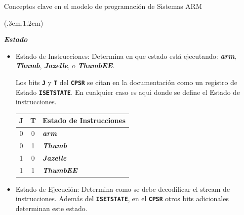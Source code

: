 \documentclass[usenames,table,dvipsnames,aspectratio=169]{beamer}
\newcommand{\arm}{\textbf{\textit{arm}}}
\newcommand{\Thumb}{\textbf{\textit{Thumb}}}
\newcommand{\jazz}{\textbf{\textit{Jazelle}}}
\newcommand{\tbee}{\textbf{\textit{ThumbEE}}}
\begin{document}
\begin{frame}{Conceptos clave en el modelo de programación de Sistemas ARM}
 \begin{textblock*}{\textwidth}(.3cm,1.2cm)
  \begin{tcolorbox}[enhanced,colframe=blue!70!black, colback=blue!4, drop fuzzy shadow=black!40, boxrule=0.8pt, boxsep=2mm, left=2mm, right=2mm, top=1mm, bottom=1mm, arc=2mm]
   \textbf{\textit{Estado}}
   \begin{itemize}
    \item Estado de Instrucciones: Determina en que estado está ejecutando: \arm, \Thumb, \jazz, o \tbee.

    Los bits \textbf{\texttt{J}} y \textbf{\texttt{T}} del \textbf{\texttt{CPSR}} se citan en la documentación como un registro de Estado \texttt{\textbf{ISETSTATE}}. En cualquier caso es aqui donde se define el Estado de instrucciones.
    \begin{center}
     \begin{tabular}{|c|c|l|}
      J & T & Estado de Instrucciones\\
      \hline
      0 & 0 & \arm \\
      0 & 1 & \Thumb \\
      1 & 0 & \jazz \\
      1 & 1 & \tbee \\
     \end{tabular}
    \end{center}
    \item Estado de Ejecución: Determina como se debe decodificar el stream de instrucciones. Además del \texttt{\textbf{ISETSTATE}}, en el \textbf{\texttt{CPSR}} otros bits adicionales determinan este estado.
   \end{itemize}
  \end{tcolorbox}
  \end{textblock*}
\end{frame}
\end{document}
